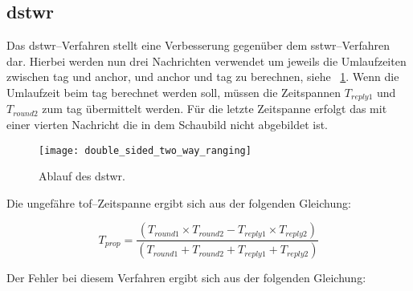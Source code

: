 \begin{comment}
------------------------------------------------------------------------------------------
- \cite{decawave2016dw1kusermanual}
	- Where the clock in device A runs at ka times the desired frequency and the clock in device B runs at kb times the desired frequency and both ka & kb are close to 1.
	- To give some idea of the size of this error, if devices A and B have clocks where each are 20 ppm away (the worst case specification) from the nominal clock in directions which make their combined error additive and equal to 40 ppm, then ka and kb might both be 0.99998 or 1.00002.
	- Even with a relatively large UWB operating range of say 100 m, the TOF is just 333 ns, so the error is 20 × 10-6 × 333 × 10-9 seconds, which is 6.7 × 10-12 seconds or 6.7 picoseconds which is approximately 2.2 mm.
\end{comment}
\subsection{\acrlong{dstwr}}

Das \Gls{dstwr}--Verfahren stellt eine Verbesserung gegenüber dem \Gls{sstwr}--Verfahren dar. Hierbei werden nun drei Nachrichten verwendet um jeweils die Umlaufzeiten zwischen \Gls{tag} und \Gls{anchor}, und \Gls{anchor} und \Gls{tag} zu berechnen, siehe \figurename~\ref{fig:double_sided_two_way_ranging}. Wenn die Umlaufzeit beim \Gls{tag} berechnet werden soll, müssen die Zeitspannen $T_{reply1}$ und $T_{round2}$ zum \Gls{tag} übermittelt werden. Für die letzte Zeitspanne erfolgt das mit einer vierten Nachricht die in dem Schaubild nicht abgebildet ist. \cite{decawave2015twr, decawave2016dw1kusermanual}

\begin{figure}[ht]
	\centering
	\texttt{[image: double\_sided\_two\_way\_ranging]}
	\caption{Ablauf des \acrlong{dstwr}.}
	\label{fig:double_sided_two_way_ranging}
\end{figure}

Die ungefähre \Gls{tof}--Zeitspanne ergibt sich aus der folgenden Gleichung:

\[T_{prop}=\frac{\left(T_{round1}\times T_{round2}-T_{reply1}\times T_{reply2}\right)}{\left(T_{round1}+T_{round2}+T_{reply1}+T_{reply2}\right)}\]

Der Fehler bei diesem Verfahren ergibt sich aus der folgenden Gleichung:

